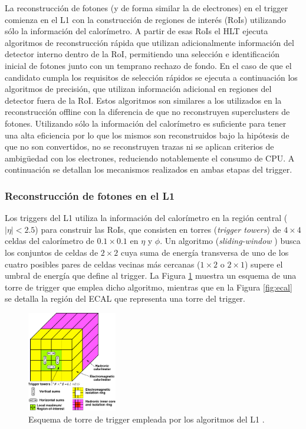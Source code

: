 La reconstrucción de fotones \cite{TRIG-2018-05} (y de forma similar la de electrones) en el trigger comienza en el L1 con la construcción de regiones de interés (RoIs) utilizando sólo la información del calorímetro. A partir de esas RoIs el HLT ejecuta algoritmos de reconstrucción rápida que utilizan adicionalmente información del detector interno dentro de la RoI, permitiendo una selección e identificación inicial de fotones junto con un temprano rechazo de fondo. En el caso de que el candidato cumpla los requisitos de selección rápidos se ejecuta a continuación los algoritmos de precisión, que utilizan información adicional en regiones del detector fuera de la RoI. Estos algoritmos son similares a los utilizados en la reconstrucción offline con la diferencia de que no reconstruyen superclusters de fotones. Utilizando sólo la información del calorímetro es suficiente para tener una alta eficiencia por lo que los mismos son reconstruidos bajo la hipótesis de que no son convertidos, no se reconstruyen trazas ni se aplican criterios de ambigüedad con los electrones, reduciendo notablemente el consumo de CPU. 
A continuación se detallan los mecanismos realizados en ambas etapas del trigger.

\subsubsection{Reconstrucción de fotones en el L1}

Los triggers del L1 utiliza la información del calorímetro en la región central ($|\eta|<2.5$) para construir las RoIs, que consisten en torres (\textit{trigger towers}) de $4\times4$ celdas del calorímetro de $0.1\times0.1$ en $\eta$ y $\phi$. Un algoritmo (\textit{sliding-window} \cite{Lampl:1099735}) busca los conjuntos de celdas de $2\times2$ cuya suma de energía transversa de uno de los cuatro posibles pares de celdas vecinas más cercanas ($1\times2$ o $2\times1$) supere el umbral de energía que define al trigger. La Figura \ref{fig:l1_reco} muestra un esquema de una torre de trigger que emplea dicho algoritmo, mientras que en la Figura \ref{fig:ecal} se detalla la región del ECAL que representa una torre del trigger.

\begin{figure}
  \centering
  \includegraphics[width=0.35\textwidth]{images/trigger/l1_reco.pdf}
  \caption{Esquema de torre de trigger empleada por los algoritmos del L1 \cite{TRIG-2016-01}.}
  \label{fig:l1_reco}
\end{figure}


